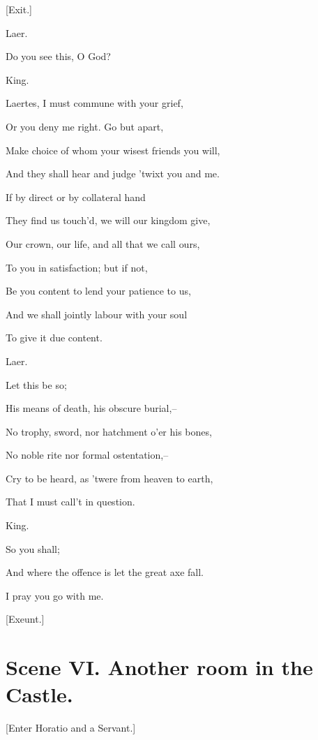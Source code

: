 \documentclass[12pt]{book}
\begin{document}
[Exit.]



Laer.

Do you see this, O God?



King.

Laertes, I must commune with your grief,

Or you deny me right. Go but apart,

Make choice of whom your wisest friends you will,

And they shall hear and judge 'twixt you and me.

If by direct or by collateral hand

They find us touch'd, we will our kingdom give,

Our crown, our life, and all that we call ours,

To you in satisfaction; but if not,

Be you content to lend your patience to us,

And we shall jointly labour with your soul

To give it due content.



Laer.

Let this be so;

His means of death, his obscure burial,--

No trophy, sword, nor hatchment o'er his bones,

No noble rite nor formal ostentation,--

Cry to be heard, as 'twere from heaven to earth,

That I must call't in question.



King.

So you shall;

And where the offence is let the great axe fall.

I pray you go with me.



[Exeunt.]







\section*{Scene VI. Another room in the Castle.}



[Enter Horatio and a Servant.]
\end{document}
